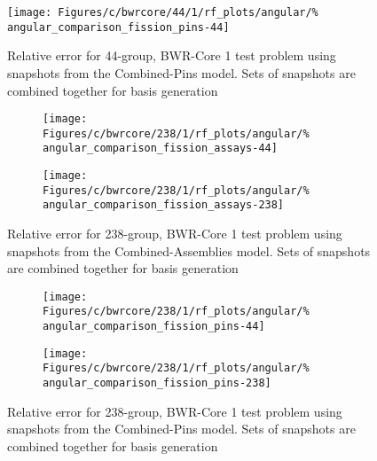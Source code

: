 \begin{figure*}[tb]
    \centering
    \texttt{[image: Figures/c/bwrcore/44/1/rf\_plots/angular/\%
        angular\_comparison\_fission\_pins-44]}
    \caption{Relative error for 44-group, BWR-Core 1 test problem using 
        snapshots from the Combined-Pins model.  Sets of snapshots are 
        combined together for basis generation}
    \label{fig:BWR1-pins-combined}
\end{figure*}

\begin{figure*}[tb]
    \centering
    \begin{subfigure}{0.5\textwidth}
        \centering
        \texttt{[image: Figures/c/bwrcore/238/1/rf\_plots/angular/\%
            angular\_comparison\_fission\_assays-44]}
    \end{subfigure}%
    \begin{subfigure}{0.5\textwidth}
        \centering
        \texttt{[image: Figures/c/bwrcore/238/1/rf\_plots/angular/\%
            angular\_comparison\_fission\_assays-238]}
    \end{subfigure}
    \caption{Relative error for 238-group, BWR-Core 1 test problem using 
        snapshots from the Combined-Assemblies model.  Sets of snapshots are 
        combined together for basis generation}
    \label{fig:BWR1-assay-combined-238}
\end{figure*}

\begin{figure*}[tb]
    \centering
    \begin{subfigure}{0.5\textwidth}
        \centering
        \texttt{[image: Figures/c/bwrcore/238/1/rf\_plots/angular/\%
            angular\_comparison\_fission\_pins-44]}
    \end{subfigure}%
    \begin{subfigure}{0.5\textwidth}
        \centering
        \texttt{[image: Figures/c/bwrcore/238/1/rf\_plots/angular/\%
            angular\_comparison\_fission\_pins-238]}
    \end{subfigure}
    \caption{Relative error for 238-group, BWR-Core 1 test problem using 
        snapshots from the Combined-Pins model.  Sets of snapshots are 
        combined together for basis generation}
    \label{fig:BWR1-pins-combined-238}
\end{figure*}

